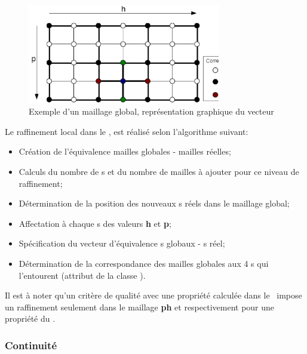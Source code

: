 \begin{description}
	 \begin{figure}[H]
	  \center
	  \includegraphics[width=0.75\textwidth]{schema_2d_ndglb.eps}
	  \caption{Exemple d'un maillage global, représentation graphique du vecteur }\label{nodeglb}
	 \end{figure}
	 
	 Le raffinement local dans le \pph, est réalisé selon l'algorithme suivant:
	 \vspace{0.3cm}
	 \begin{itemize}
	  \item Création de l'équivalence mailles globales - mailles réelles;
	  
	  \item Calculs du nombre de \n s et du nombre de mailles à ajouter pour ce niveau de raffinement;
	  
	  \item Détermination de la position des nouveaux \n s réels dans le maillage global;
	  
	  \item Affectation à chaque \n s des valeurs \textbf{h} et \textbf{p};
	  
	  \item Spécification du vecteur d'équivalence \n s globaux - \n s réel;
	  
	  \item Détermination de la correspondance des mailles globales aux 4 \n s qui l'entourent (attribut  de la classe \MESH).
	 \end{itemize}

	 
	\end{description}

	Il est à noter qu'un critère de qualité avec une propriété calculée dans le \pph\ 
	impose un raffinement seulement dans le maillage \textbf{ph} 
	et respectivement pour une propriété du \sgp.

      
      \subsubsection{Continuité}\label{continuite}
      
